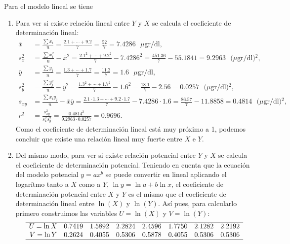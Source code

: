 {Para el modelo lineal se tiene
\begin{enumerate}
\item Para ver si existe relación lineal entre $Y$ y $X$ se calcula el coeficiente de determinación lineal:
\begin{align*}
\bar x &= \frac{\sum x_i}{n} = \frac{2.1+\cdots+9.2}{7} = \frac{52}{7} = 7.4286 \text{ $\mu$gr/dl},\\
s_x^2 &= \frac{\sum x_i^2}{n}-\bar x^2 = \frac{2.1^2+\cdots+9.2^2}{7} -7.4286^2= \frac{451.36}{7}-55.1841 = 9.2963 \text{ $(\mu$gr/dl)$^2$},\\
\bar y &= \frac{\sum y_j}{n} = \frac{1.3+\cdots+1.7}{7} = \frac{11.2}{7} = 1.6 \text{ $\mu$gr/dl},\\
s_y^2 &= \frac{\sum y_j^2}{n}-\bar y^2 = \frac{1.3^2+\cdots+1.7^2}{7} -1.6^2= \frac{18.1}{7}-2.56 = 0.0257 \text{ $(\mu$gr/dl)$^2$},\\
s_{xy} &= \frac{\sum x_iy_j}{n}-\bar x\bar y = \frac{2.1\cdot1.3+\cdots+9.2\cdot1.7}{7}-7.4286\cdot1.6 = \frac{86.57}{7}-11.8858 = 0.4814 \text{ $(\mu$gr/dl)$^2$},\\
r^2 &= \frac{s_{xy}^2}{s_x^2 s_y^2} = \frac{0.4814^2}{9.2963\cdot 0.0257} = 0.9696.
\end{align*}
Como el coeficiente de determinación lineal está muy próximo a 1, podemos concluir que existe una relación lineal muy fuerte entre $X$ e $Y$.

\item Del mismo modo, para ver si existe relación potencial entre $Y$ y $X$ se calcula el coeficiente de determinación potencial.
Teniendo en cuenta que la ecuación del modelo potencial $y=ax^b$ se puede convertir en lineal aplicando el logarítmo tanto a $X$ como a $Y$, 
$\ln y = \ln a + b\ln x$, el coeficiente de determinación potencial entre $X$ y $Y$ es el mismo que el coeficiente de determinación lineal entre $\ln(X)$ y $\ln(Y)$.
Así pues, para calcularlo primero construimos las variables $U=\ln(X)$ y $V=\ln(Y)$:
\[
\begin{array}{rrrrrrrr}
   \hline
U = \ln X & 0.7419 & 1.5892 & 2.2824 & 2.4596 & 1.7750 & 2.1282 & 2.2192 \\ 
  V = \ln Y & 0.2624 & 0.4055 & 0.5306 & 0.5878 & 0.4055 & 0.5306 & 0.5306 \\ 
   \hline
\end{array}\]


\end{enumerate}}
